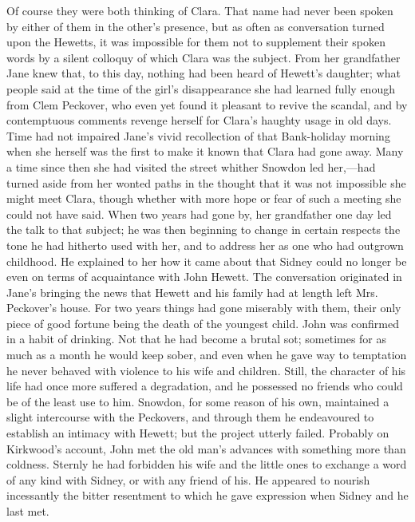 Of course they were both thinking of Clara. That name had never been
spoken by either of them in the other's presence, but as often as
conversation turned upon the Hewetts, it was impossible for them not to
supplement their spoken words by a silent colloquy of which Clara was
the subject. From her grandfather Jane knew that, to this day, nothing
had been heard of Hewett's daughter; what people said at the time of the
girl's disappearance she had learned fully enough from Clem Peckover,
who even yet found it pleasant to revive the scandal, and by
contemptuous comments revenge herself for Clara's haughty {}usage in old
days. Time had not impaired Jane's vivid recollection of that
Bank-holiday morning when she herself was the first to make it known
that Clara had gone away. Many a time since then she had visited the
street whither Snowdon led her,---had turned aside from her wonted paths
in the thought that it was not impossible she might meet Clara, though
whether with more hope or fear of such a meeting she could not have
said. When two years had gone by, her grandfather one day led the talk
to that subject; he was then beginning to change in certain respects the
tone he had hitherto used with her, and to address her as one who had
outgrown childhood. He explained to her how it came about that Sidney
could no longer be even on terms of acquaintance with John Hewett. The
conversation originated in Jane's bringing the news that Hewett and his
family had at length left Mrs. Peckover's house. For two years things
had gone miserably with them, their only piece of good fortune being the
death of the youngest child. John was confirmed in a {}habit of
drinking. Not that he had become a brutal sot; sometimes for as much as
a month he would keep sober, and even when he gave way to temptation he
never behaved with violence to his wife and children. Still, the
character of his life had once more suffered a degradation, and he
possessed no friends who could be of the least use to him. Snowdon, for
some reason of his own, maintained a slight intercourse with the
Peckovers, and through them he endeavoured to establish an intimacy with
Hewett; but the project utterly failed. Probably on Kirkwood's account,
John met the old man's advances with something more than coldness.
Sternly he had forbidden his wife and the little ones to exchange a word
of any kind with Sidney, or with any friend of his. He appeared to
nourish incessantly the bitter resentment to which he gave expression
when Sidney and he last met.

